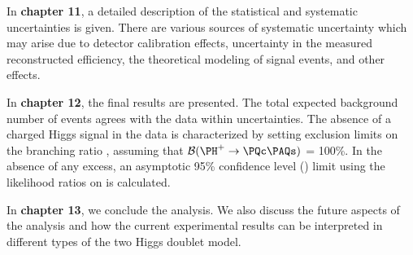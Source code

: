 In \textbf{chapter 11}, a detailed description of the statistical and systematic
uncertainties is given. There are various sources of systematic uncertainty which may 
arise due to detector calibration effects, uncertainty in the measured reconstructed 
efficiency, the theoretical modeling of signal events, and other effects. 

In \textbf{chapter 12}, the final results are presented. The total expected background number 
of events agrees with the data within uncertainties. The absence of a charged Higgs 
signal in the data is characterized by setting exclusion limits on the branching ratio 
\brThb, assuming that $\mathcal{B}(\Hp \to \PQc\PAQs)$ = 100\%. 
In the absence of any excess, an asymptotic 95\% confidence level (\CL) limit using 
the likelihood ratios on \brThb is calculated. 

In \textbf{chapter 13}, we conclude the analysis. We also discuss the future 
aspects of the analysis and how the current experimental results can be interpreted 
in different types of the two Higgs doublet model. 



